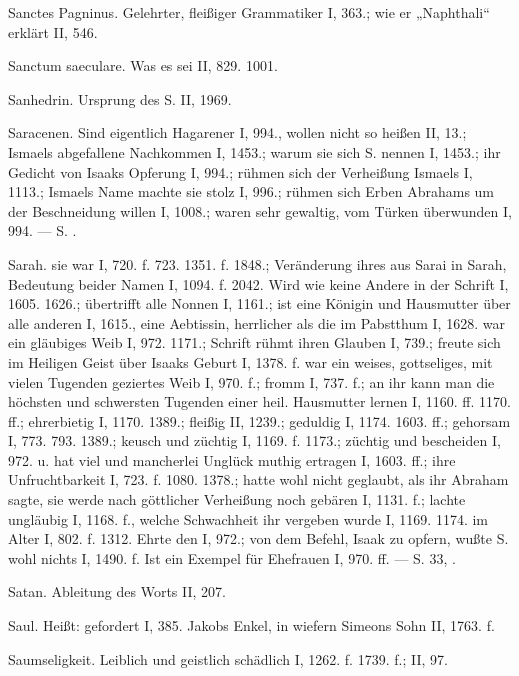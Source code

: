 Sanctes Pagninus. Gelehrter, fleißiger Grammatiker I, 363.; wie er „Naphthali“ erklärt II, 546.

Sanctum saeculare. Was es sei II, 829. 1001.

Sanhedrin. Ursprung des S. II, 1969.

Saracenen. Sind eigentlich Hagarener I, 994., wollen nicht so heißen II, 13.; Ismaels abgefallene Nachkommen I, 1453.; warum sie sich S. nennen I, 1453.; ihr Gedicht von Isaaks Opferung I, 994.; rühmen sich der Verheißung Ismaels I, 1113.; Ismaels Name machte sie stolz I, 996.; rühmen sich Erben Abrahams um der Beschneidung willen I, 1008.; waren sehr gewaltig, vom Türken überwunden I, 994. — S. .

Sarah.  sie war I, 720. f. 723. 1351. f. 1848.; Veränderung ihres  aus Sarai in Sarah, Bedeutung beider Namen I, 1094. f. 2042. Wird wie keine Andere in der Schrift  I, 1605. 1626.; übertrifft alle Nonnen I, 1161.; ist eine Königin und Hausmutter über alle anderen I, 1615., eine Aebtissin, herrlicher als die im Pabstthum I, 1628.  war ein gläubiges Weib I, 972. 1171.; Schrift rühmt ihren Glauben I, 739.; freute sich im Heiligen Geist über Isaaks Geburt I, 1378. f.  war ein weises, gottseliges, mit vielen Tugenden geziertes Weib I, 970. f.; fromm I, 737. f.; an ihr kann man die höchsten und schwersten Tugenden einer heil. Hausmutter lernen I, 1160. ff. 1170. ff.; ehrerbietig I, 1170. 1389.; fleißig II, 1239.; geduldig I, 1174. 1603. ff.; gehorsam I, 773. 793. 1389.; keusch und züchtig I, 1169. f. 1173.; züchtig und bescheiden I, 972.  u.  hat viel und mancherlei Unglück muthig ertragen I, 1603. ff.; ihre Unfruchtbarkeit I, 723. f. 1080. 1378.; hatte wohl nicht geglaubt, als ihr Abraham sagte, sie werde nach göttlicher Verheißung noch gebären I, 1131. f.; lachte ungläubig I, 1168. f., welche Schwachheit ihr vergeben wurde I, 1169. 1174.  im Alter I, 802. f. 1312. Ehrte den  I, 972.; von dem Befehl, Isaak zu opfern, wußte S. wohl nichts I, 1490. f. Ist ein Exempel für Ehefrauen I, 970. ff. — S.  33, .

Satan. Ableitung des Worts II, 207.

Saul. Heißt: gefordert I, 385. Jakobs Enkel, in wiefern Simeons Sohn II, 1763. f.

Saumseligkeit. Leiblich und geistlich schädlich I, 1262. f. 1739. f.; II, 97.

